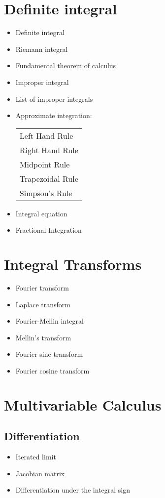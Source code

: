 \documentclass[12pt]{article}
\theoremstyle{definition}
\begin{document}
\section{Definite integral}

\begin{itemize}
\item Definite integral
\item Riemann integral
\item Fundamental theorem of calculus
\item Improper integral
\item List of improper integrals
\item Approximate integration: \begin{tabular}{l}
Left Hand Rule \\
Right Hand Rule \\
Midpoint Rule \\
Trapezoidal Rule \\
Simpson's Rule \end{tabular} 
\item Integral equation
\item Fractional Integration
\end{itemize}

\section{Integral Transforms}
\begin{itemize}
\item Fourier transform
\item Laplace transform 
\item Fourier-Mellin integral
\item Mellin's transform
\item Fourier sine transform
\item Fourier cosine transform
\end{itemize}

\section{Multivariable Calculus}
\subsection{Differentiation}
\begin{itemize}
\item Iterated limit
\item Jacobian matrix
\item Differentiation under the integral sign
\end{itemize}
\end{document}
